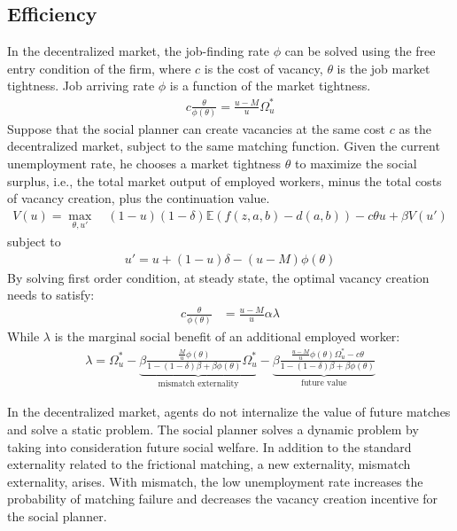 \documentclass[12pt]{article}
\newcommand{\E}{\mathbb{E}}
\newcommand{\1}{\mathbb{1}}
\begin{document}
\subsection{Efficiency}
In the decentralized market, the job-finding rate $\phi$ can be solved using the free entry condition of the firm, where $c$ is the cost of vacancy, $\theta$ is the job market tightness. Job arriving rate $\phi$ is a function of the market tightness. 
\begin{align*}
c\frac{\theta}{\phi(\theta)} = \frac{u-M}{u}\Omega_u^* 
\end{align*}
Suppose that the social planner can create vacancies at the same cost $c$ as the decentralized market, subject to the same matching function. Given the current unemployment rate, he chooses a market tightness $\theta$ to maximize the social surplus, i.e., the total market output of employed workers, minus the total costs of vacancy creation, plus the continuation value. 
\begin{align*}
V(u) = \max_{\theta,u'}\quad (1-u)(1-\delta)\E(f(z,a,b)-d(a,b))-c\theta u+\beta V(u')
\end{align*}
subject to 
\begin{align*}
u' = u+(1-u)\delta-(u-M)\phi(\theta)
\end{align*}
By solving first order condition, at steady state, the optimal vacancy creation needs to satisfy:
\begin{align*}
c\frac{\theta}{\phi(\theta)} &= \frac{u-M}{u}\alpha\lambda 
\end{align*}
While $\lambda$ is the marginal social benefit of an additional employed worker: 
\begin{align*}
\lambda =\Omega_u^*-\underbrace{\beta\frac{\frac{M}{u}\phi(\theta)}{1-(1-\delta)\beta+\beta\phi(\theta)}\Omega_u^*}_{\text{mismatch externality}} -\underbrace{\beta\frac{\frac{u-M}{u}\phi(\theta)\Omega_u^*-c\theta}{1-(1-\delta)\beta+\beta\phi(\theta)}}_{\text{future value}}
\end{align*}

In the decentralized market, agents do not internalize the value of future matches and solve a static problem. The social planner solves a dynamic problem by taking into consideration future social welfare. In addition to the standard externality related to the frictional matching, a new externality, mismatch externality, arises. With mismatch, the low unemployment rate increases the probability of matching failure and decreases the vacancy creation incentive for the social planner. 
\end{document}
